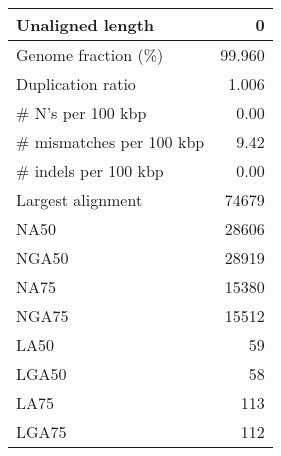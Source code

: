 \documentclass[12pt,a4paper]{article}
\begin{document}
\begin{table}[ht]
\begin{center}
\begin{tabular}{|l*{1}{|r}|}
Unaligned length & 0 \\ \hline
Genome fraction (\%) & 99.960 \\ \hline
Duplication ratio & 1.006 \\ \hline
\# N's per 100 kbp & 0.00 \\ \hline
\# mismatches per 100 kbp & 9.42 \\ \hline
\# indels per 100 kbp & 0.00 \\ \hline
Largest alignment & 74679 \\ \hline
NA50 & 28606 \\ \hline
NGA50 & 28919 \\ \hline
NA75 & 15380 \\ \hline
NGA75 & 15512 \\ \hline
LA50 & 59 \\ \hline
LGA50 & 58 \\ \hline
LA75 & 113 \\ \hline
LGA75 & 112 \\ \hline
\end{tabular}
\end{center}
\end{table}
\end{document}
